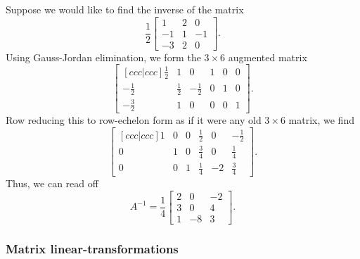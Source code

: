 \begin{exm}{}{}
	Suppose we would like to find the inverse of the matrix
	\begin{equation}
		\frac{1}{2}\begin{bmatrix}1 & 2 & 0 \\ -1 & 1 & -1 \\ -3 & 2 & 0\end{bmatrix}.
	\end{equation}
	Using Gauss-Jordan elimination, we form the $3\times 6$ augmented matrix
	\begin{equation}
		\begin{bmatrix}[c c c | c c c]\tfrac{1}{2} & 1 & 0 & 1 & 0 & 0 \\ -\tfrac{1}{2} & \tfrac{1}{2} & -\tfrac{1}{2} & 0 & 1 & 0\\ -\tfrac{3}{2} & 1 & 0 & 0 & 0 & 1\end{bmatrix}.
	\end{equation}
	Row reducing this to row-echelon form as if it were any old $3\times 6$ matrix, we find
	\begin{equation}
		\begin{bmatrix}[c c c | c c c]1 & 0 & 0 & \tfrac{1}{2} & 0 & -\tfrac{1}{2} \\ 0 & 1 & 0 & \tfrac{3}{4} & 0 & \tfrac{1}{4} \\ 0 & 0 & 1 & \tfrac{1}{4} & -2 & \tfrac{3}{4}\end{bmatrix}.
	\end{equation}
	Thus, we can read off
	\begin{equation}
		A^{-1}=\frac{1}{4}\begin{bmatrix}2 & 0 & -2 \\ 3 & 0 & 4 \\ 1 & -8 & 3\end{bmatrix}.
	\end{equation}
\end{exm}

\subsubsection{Matrix linear-transformations}

